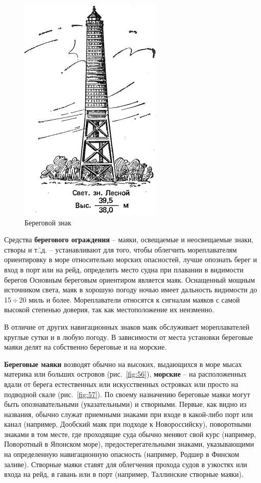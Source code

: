 \documentclass[a4paper, 12pt, twoside, final, book, russian, fittopage, cyremdash]{ncc}
\newcommand{\otdo}{\,\ensuremath{\div}\,}
\newcommand{\ris}[1]{\ref{fig:#1}}
\begin{document}
\begin{figure}[htb]
  \centering{}
  \includegraphics[scale=1.2]{0058P}
  \caption{Береговой знак}
  \label{fig:58}
\end{figure}


Средства \textbf{берегового ограждения} \--- маяки, освещаемые и неосвещаемые знаки, створы и т.\=,д. \--- устанавливают для того, чтобы облегчить мореплавателям ориентировку в море относительно морских опасностей, лучше опознать берег и вход в порт или на рейд, определить место судна при плавании в видимости берегов Основным береговым ориентиром является маяк. Оснащенный мощным источником света, маяк в хорошую погоду ночью имеет дальность видимости до 15\otdo 20 миль и более. Мореплаватели относятся к сигналам маяков с самой высокой степенью доверия, так как местоположение их неизменно. 

В отличие от других навигационных знаков маяк обслуживает мореплавателей круглые сутки и в любую погоду. В зависимости от места установки береговые маяки делят на собственно береговые и на морские. 

\textbf{Береговые маяки} возводят обычно на высоких, выдающихся в море мысах материка или больших островов (рис.~\ris{56}), \textbf{морские} \--- на расположенных вдали от берега естественных или искусственных островках или просто на подводной скале (рис.~\ris{57}). По своему назначению береговые маяки могут быть опознавательными (указательными) и створными. Первые, как видно из названия, обычно служат приемными знаками при входе в какой-либо порт или канал (например, Дообский маяк при подходе к Новороссийску), поворотными знаками в том месте, где проходящие суда обычно меняют свой курс (например, Поворотный в Японском море), предостерегательными знаками, указывающими на определенную навигационную опасность (например, Родшер в Финском заливе). Створные маяки ставят для облегчения прохода судов в узкостях или входа на рейд, в гавань или в порт (например, Таллинские створные маяки).
\end{document}
